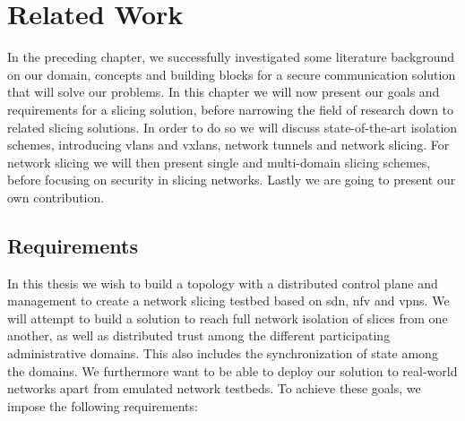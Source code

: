 \chapter{Related Work}
\label{related_work}




In the preceding chapter, we successfully investigated some literature background on our domain, concepts and building blocks for a secure communication solution that will solve our problems. In this chapter we will now present our goals and requirements for a slicing solution, before narrowing the field of research down to related slicing solutions. In order to do so we will discuss state-of-the-art isolation schemes, introducing \acrshort{vlan}s and \acrshort{vxlan}s, network tunnels and network slicing. For network slicing we will then present single and multi-domain slicing schemes, before focusing on security in slicing networks. Lastly we are going to present our own contribution.


\section{Requirements}
\label{related_work_requirements}
In this thesis we wish to build a topology with a distributed control plane and management to create a network slicing testbed based on \acrshort{sdn}, \acrshort{nfv} and \acrshort{vpn}s. We will attempt to build a solution to reach full network isolation of slices from one another, as well as distributed trust among the different participating administrative domains. This also includes the synchronization of state among the domains. We furthermore want to be able to deploy our solution to real-world networks apart from emulated network testbeds.
To achieve these goals, we impose the following requirements:

